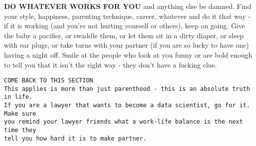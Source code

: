 \documentclass[]{book}
\begin{document}
\textbf{DO WHATEVER WORKS FOR YOU} and anything else be damned. Find your style,
happiness, parenting technique, career, whatever and do it that way - if it is
working (and you're not hurting yourself or others), keep on going. Give the
baby a pacifier, or swaddle them, or let them sit in a dirty diaper, or sleep
with ear plugs, or take turns with your partner (if you are so lucky to have
one) having a night off. Smile at the people who look at you funny or are bold
enough to tell you that it isn't the right way - they don't have a fucking clue.

\begin{verbatim}
COME BACK TO THIS SECTION
This applies is more than just parenthood - this is an absolute truth in life. 
If you are a lawyer that wants to become a data scientist, go for it. Make sure 
you remind your lawyer friends what a work-life balance is the next time they 
tell you how hard it is to make partner. 
\end{verbatim}


\end{document}
